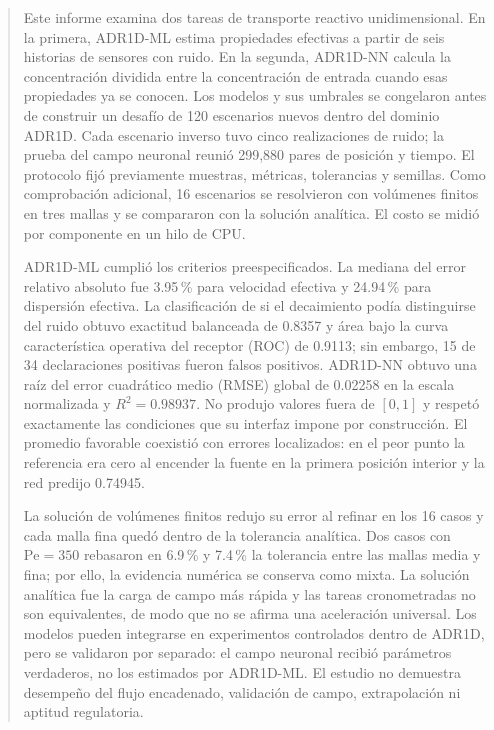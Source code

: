 \documentclass[11pt,a4paper]{article}
\begin{document}
\begin{abstract}
Este informe examina dos tareas de transporte reactivo unidimensional. En la
primera, ADR1D-ML estima propiedades efectivas a partir de seis historias de
sensores con ruido. En la segunda, ADR1D-NN calcula la concentración dividida
entre la concentración de entrada cuando esas propiedades ya se conocen. Los
modelos y sus umbrales se congelaron antes de construir un desafío de 120
escenarios nuevos dentro del dominio ADR1D. Cada escenario inverso tuvo cinco
realizaciones de ruido; la prueba del campo neuronal reunió 299,880 pares de
posición y tiempo. El protocolo fijó previamente muestras, métricas,
tolerancias y semillas. Como comprobación adicional, 16 escenarios se
resolvieron con volúmenes finitos en tres mallas y se compararon con la solución
analítica. El costo se midió por componente en un hilo de CPU.

ADR1D-ML cumplió los criterios preespecificados. La mediana del error relativo
absoluto fue 3.95\,\% para velocidad efectiva y 24.94\,\% para dispersión
efectiva. La clasificación de si el decaimiento podía distinguirse del ruido
obtuvo exactitud balanceada de 0.8357 y área bajo la curva característica
operativa del receptor (ROC) de 0.9113; sin embargo, 15 de 34 declaraciones
positivas fueron falsos positivos. ADR1D-NN obtuvo una raíz del error cuadrático
medio (RMSE) global de 0.02258 en la escala normalizada y $R^2=0.98937$. No produjo valores
fuera de $[0,1]$ y respetó exactamente las condiciones que su interfaz impone
por construcción. El promedio favorable coexistió con errores localizados: en
el peor punto la referencia era cero al encender la fuente en la primera
posición interior y la red predijo 0.74945.

La solución de volúmenes finitos redujo su error al refinar en los 16 casos y
cada malla fina quedó dentro de la tolerancia analítica. Dos casos con
$\mathrm{Pe}=350$ rebasaron en 6.9\,\% y 7.4\,\% la tolerancia entre las mallas
media y fina; por ello, la evidencia numérica se conserva como mixta. La
solución analítica fue la carga de campo más rápida y las tareas cronometradas
no son equivalentes, de modo que no se afirma una aceleración universal. Los
modelos pueden integrarse en experimentos controlados dentro de ADR1D, pero se
validaron por separado: el campo neuronal recibió parámetros verdaderos, no los
estimados por ADR1D-ML. El estudio no demuestra desempeño del flujo encadenado,
validación de campo, extrapolación ni aptitud regulatoria.
\end{abstract}
\end{document}
